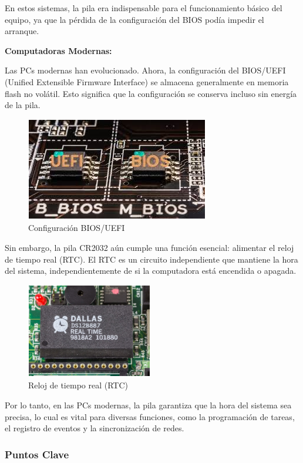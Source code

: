 En estos sistemas, la pila era indispensable para el funcionamiento básico del equipo, ya que la pérdida de la configuración del BIOS podía impedir el arranque.

\textbf{Computadoras Modernas:}

Las PCs modernas han evolucionado. Ahora, la configuración del BIOS/UEFI (Unified Extensible Firmware Interface) se almacena generalmente en memoria flash no volátil. Esto significa que la configuración se conserva incluso sin energía de la pila.

\begin{figure}[H]
  \centering
  \includegraphics[scale=0.9]{imagenes/uefi-bios.png}
  \caption{Configuración BIOS/UEFI}
\end{figure}

Sin embargo, la pila CR2032 aún cumple una función esencial: alimentar el reloj de tiempo real (RTC). El RTC es un circuito independiente que mantiene la hora del sistema, independientemente de si la computadora está encendida o apagada.

\begin{figure}[H]
  \centering
  \includegraphics{imagenes/reloj.png}
  \caption{Reloj de tiempo real (RTC)}
\end{figure}

Por lo tanto, en las PCs modernas, la pila garantiza que la hora del sistema sea precisa, lo cual es vital para diversas funciones, como la programación de tareas, el registro de eventos y la sincronización de redes.

\subsubsection{Puntos Clave}

